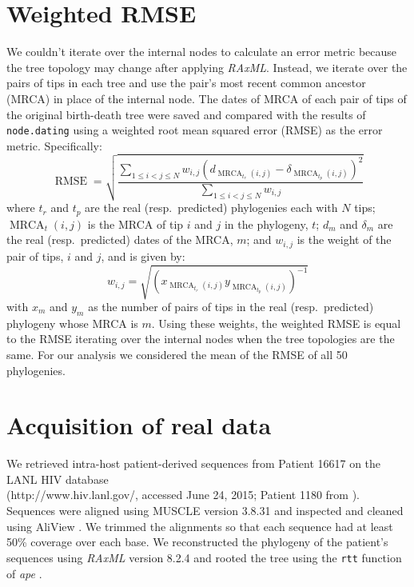\documentclass{article}
\newcommand{\code}[1]{{\tt #1}}
\begin{document}
\section{Weighted RMSE} \label{sec:rmse}
We couldn't iterate over the internal nodes to calculate an error metric because the tree topology may change after applying \emph{RAxML}.
Instead, we iterate over the pairs of tips in each tree and use the pair's most recent common ancestor (MRCA) in place of the internal node.
The dates of MRCA of each pair of tips of the original birth-death tree were saved and compared with the results of \code{node.dating} using a weighted root mean squared error (RMSE) as the error metric.
Specifically:
\[\operatorname{RMSE} = \sqrt{\frac{\sum_{1 \leq i < j \leq N}w_{i,j}\left(d_{\operatorname{MRCA}_{t_r}(i,j)} - \delta_{\operatorname{MRCA}_{t_p}(i,j)}\right)^2}{\sum_{1 \leq i < j \leq N}w_{i,j}}}\]
where $t_r$ and $t_p$ are the real (resp.~predicted) phylogenies each with $N$ tips; $\operatorname{MRCA}_t(i, j)$ is the MRCA of tip $i$ and $j$ in the phylogeny, $t$; $d_{m}$ and $\delta_m$ are the real (resp.~predicted) dates of the MRCA, $m$; and $w_{i, j}$ is the weight of the pair of tips, $i$ and $j$, and is given by:
\[w_{i, j} = \sqrt{\left(x_{\operatorname{MRCA}_{t_r}(i,j)}y_{\operatorname{MRCA}_{t_p}(i,j)}\right)^{-1}}\]
with $x_m$ and $y_m$ as the number of pairs of tips in the real (resp.~predicted) phylogeny whose MRCA is $m$.
Using these weights, the weighted RMSE is equal to the RMSE iterating over the internal nodes when the tree topologies are the same.
For our analysis we considered the mean of the RMSE of all 50 phylogenies.

\section{Acquisition of real data}
We retrieved intra-host patient-derived sequences from Patient 16617 on the LANL HIV database \\ (http://www.hiv.lanl.gov/, accessed June 24, 2015; Patient 1180 from \cite{Llewellyn06}).
Sequences were aligned using MUSCLE version 3.8.31 \cite{Muscle04} and inspected and cleaned using AliView \citep{AliView14}. 
We trimmed the alignments so that each sequence had at least 50\% coverage over each base.
We reconstructed the phylogeny of the patient's sequences using \emph{RAxML} version 8.2.4 \citep{Raxml14} and rooted the tree using the \code{rtt} function of \emph{ape} \citep{APE}.



\end{document}
